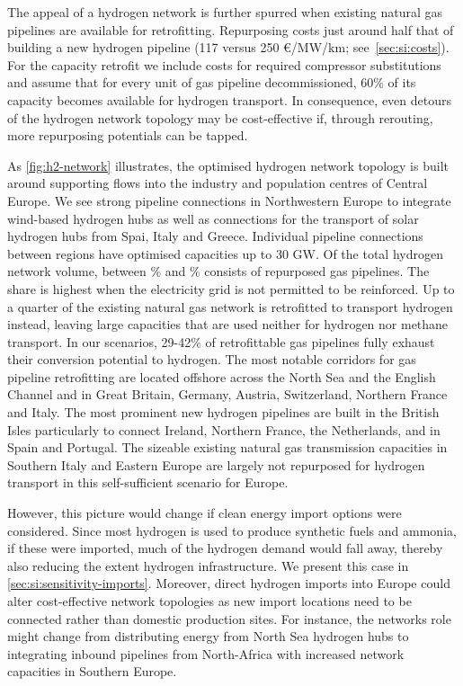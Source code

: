 The appeal of a hydrogen network is further spurred when existing natural gas
pipelines are available for retrofitting. Repurposing costs just around half
that of building a new hydrogen pipeline (117 versus 250 \euro/MW/km;
see~\cref{sec:si:costs}). For the capacity retrofit we include costs for
required compressor substitutions and assume that for every unit of gas pipeline
decommissioned, 60\% of its capacity becomes available for hydrogen transport.
In consequence, even detours of the hydrogen network topology may be
cost-effective if, through rerouting, more repurposing potentials can be tapped.

As \cref{fig:h2-network} illustrates, the optimised hydrogen network topology is
built around supporting flows into the industry and population centres of
Central Europe. We see strong pipeline connections in Northwestern Europe to
integrate wind-based hydrogen hubs as well as connections for the transport of
solar hydrogen hubs from Spai, Italy and Greece. Individual pipeline connections
between regions have optimised capacities up to 30 GW. Of the total hydrogen
network volume, between \minretroshare\% and \maxretroshare\% consists of
repurposed gas pipelines. The share is highest when the electricity grid is not
permitted to be reinforced. Up to a quarter of the existing natural gas network
is retrofitted to transport hydrogen instead, leaving large capacities that are
used neither for hydrogen nor methane transport. In our scenarios, 29-42\% of
retrofittable gas pipelines fully exhaust their conversion potential to
hydrogen. The most notable corridors for gas pipeline retrofitting are located
offshore across the North Sea and the English Channel and in Great Britain,
Germany, Austria, Switzerland, Northern France and Italy. The most prominent new
hydrogen pipelines are built in the British Isles particularly to connect
Ireland, Northern France, the Netherlands, and in Spain and Portugal. The
sizeable existing natural gas transmission capacities in Southern Italy and
Eastern Europe are largely not repurposed for hydrogen transport in this
self-sufficient scenario for Europe.

However, this picture would change if clean energy import options were
considered. Since most hydrogen is used to produce synthetic fuels and ammonia,
if these were imported, much of the hydrogen demand would fall away, thereby
also reducing the extent hydrogen infrastructure. We present this case in
\cref{sec:si:sensitivity-imports}. Moreover, direct hydrogen imports into Europe
could alter cost-effective network topologies as new import locations need to be
connected rather than domestic production sites. For instance, the networks role
might change from distributing energy from North Sea hydrogen hubs to
integrating inbound pipelines from North-Africa with increased network
capacities in Southern Europe.\cite{wetzelGreenEnergy2022}

